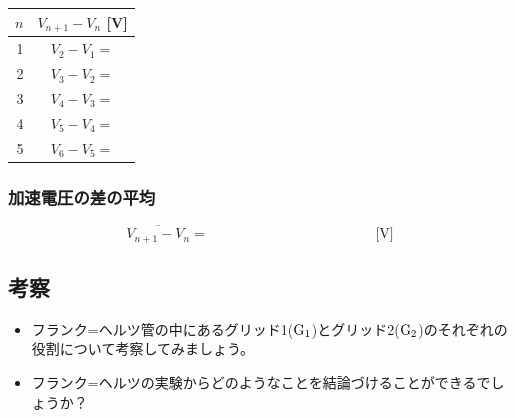 \hspace*{-\parindent}
\begin{tabular}{|r|c|}
\hline
$n$ & $V_{n+1}-V_n$ [V]\\
\hline\hline
1 & $V_2-V_1=$ \hspace{5cm} \\\hline
2 & $V_3-V_2=$ \hspace{5cm} \\\hline
3 & $V_4-V_3=$ \hspace{5cm} \\\hline
4 & $V_5-V_4=$ \hspace{5cm} \\\hline
5 & $V_6-V_5=$ \hspace{5cm} \\\hline
\end{tabular}

\subsubsection*{加速電圧の差の平均}
\[
\overline{V_{n+1}-V_n}=\hspace{5cm} \text{[V]}
\]


\subsection*{考察}

\begin{itemize}

\item フランク=ヘルツ管の中にあるグリッド1(${\rm G}_1$)とグリッド2(${\rm G}_2$)のそれぞれの役割について考察してみましょう。

\vspace{5cm}

\item フランク=ヘルツの実験からどのようなことを結論づけることができるでしょうか？


\end{itemize}

